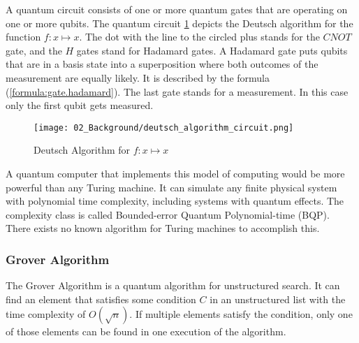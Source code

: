 A quantum circuit consists of one or more quantum gates that are operating on one or more qubits.
The quantum circuit \ref{figure:gate.deutsch.circuit} depicts the Deutsch algorithm for the function $f: x \mapsto x$.
The dot with the line to the circled plus stands for the $CNOT$ gate, and the $H$ gates stand for Hadamard gates.
A Hadamard gate puts qubits that are in a basis state into a superposition where both outcomes of the measurement are equally likely.
It is described by the formula (\ref{formula:gate.hadamard}).
The last gate stands for a measurement.
In this case only the first qubit gets measured.
\cite{Deutsch1985}
\begin{figure}[!h]
  \centering
  \texttt{[image: 02\_Background/deutsch\_algorithm\_circuit.png]}
  \caption{Deutsch Algorithm for $f: x \mapsto x$}
  \label{figure:gate.deutsch.circuit}
\end{figure}

A quantum computer that implements this model of computing would be more powerful than any Turing machine.
It can simulate any finite physical system with polynomial time complexity, including systems with quantum effects.
The complexity class is called Bounded-error Quantum Polynomial-time (BQP).
There exists no known algorithm for Turing machines to accomplish this.
\cite{Deutsch1985, Shor1998}

\subsubsection{Grover Algorithm}

The Grover Algorithm is a quantum algorithm for unstructured search.
It can find an element that satisfies some condition $C$ in an unstructured list with the time complexity of $O(\sqrt{n})$.
\cite{Grover1996}
If multiple elements satisfy the condition, only one of those elements can be found in one execution of the algorithm.
\cite{Boyer1998}

